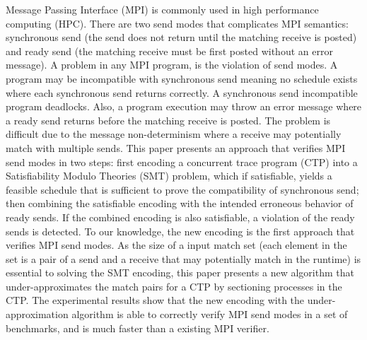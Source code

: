 Message Passing Interface (MPI) is commonly used in high performance computing (HPC). 
There are two send modes that complicates MPI semantics: synchronous send (the send does not return until the matching receive is posted) and ready send (the matching receive must be first posted without an error message). 
A problem in any MPI program, is the violation of send modes.  
A program may be incompatible with synchronous send meaning no schedule exists where each synchronous send returns correctly. A synchronous send incompatible program deadlocks. 
Also, a program execution may throw an error message where a ready send returns before the matching receive is posted.
The problem is difficult due to the message non-determinism where a receive may potentially match with multiple sends. 
%
This paper presents an approach that verifies MPI send modes in two steps: first encoding a concurrent trace program (CTP) into a Satisfiability Modulo Theories (SMT) problem, which if satisfiable, yields a feasible schedule that is sufficient to prove the compatibility of synchronous send; then combining the satisfiable encoding with the intended erroneous behavior of ready sends. If the combined encoding is also satisfiable, a violation of the ready sends is detected.
%
To our knowledge, the new encoding is the first approach that verifies MPI send modes.
% 
As the size of a input match set (each element in the set is a pair of a send and a receive that may potentially match in the runtime) is essential to solving the SMT encoding, this paper presents a new algorithm that under-approximates the match pairs for a CTP by sectioning processes in the CTP. 
The experimental results show that the new encoding with the under-approximation algorithm is able to correctly verify MPI send modes in a set of benchmarks, and is much faster than a existing MPI verifier.



